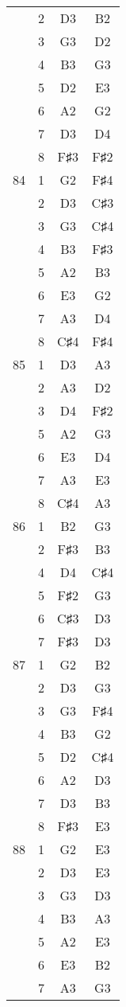 \documentclass{article}
\begin{document}
\begin{longtable}{|c|c|c|c|}
  & 2 & D3 & B2 \\ 
  & 3 & G3 & D2 \\ 
  & 4 & B3 & G3 \\ 
  & 5 & D2 & E3 \\ 
  & 6 & A2 & G2 \\ 
  & 7 & D3 & D4 \\ 
  & 8 & F♯3 & F♯2 \\ 
\hline
84 & 1 & G2 & F♯4 \\ 
  & 2 & D3 & C♯3 \\ 
  & 3 & G3 & C♯4 \\ 
  & 4 & B3 & F♯3 \\ 
  & 5 & A2 & B3 \\ 
  & 6 & E3 & G2 \\ 
  & 7 & A3 & D4 \\ 
  & 8 & C♯4 & F♯4 \\ 
\hline
85 & 1 & D3 & A3 \\ 
  & 2 & A3 & D2 \\ 
  & 3 & D4 & F♯2 \\ 
  & 5 & A2 & G3 \\ 
  & 6 & E3 & D4 \\ 
  & 7 & A3 & E3 \\ 
  & 8 & C♯4 & A3 \\ 
\hline
86 & 1 & B2 & G3 \\ 
  & 2 & F♯3 & B3 \\ 
  & 4 & D4 & C♯4 \\ 
  & 5 & F♯2 & G3 \\ 
  & 6 & C♯3 & D3 \\ 
  & 7 & F♯3 & D3 \\ 
\hline
87 & 1 & G2 & B2 \\ 
  & 2 & D3 & G3 \\ 
  & 3 & G3 & F♯4 \\ 
  & 4 & B3 & G2 \\ 
  & 5 & D2 & C♯4 \\ 
  & 6 & A2 & D3 \\ 
  & 7 & D3 & B3 \\ 
  & 8 & F♯3 & E3 \\ 
\hline
88 & 1 & G2 & E3 \\ 
  & 2 & D3 & E3 \\ 
  & 3 & G3 & D3 \\ 
  & 4 & B3 & A3 \\ 
  & 5 & A2 & E3 \\ 
  & 6 & E3 & B2 \\ 
  & 7 & A3 & G3 \\ 

\end{longtable}
\end{document}
